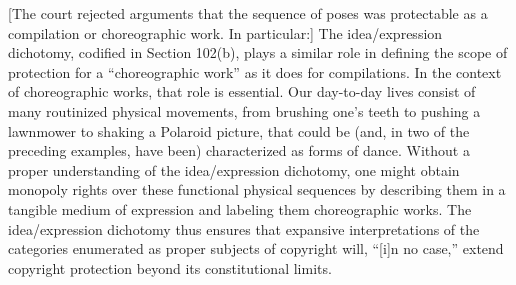 %

[The court rejected arguments that the sequence of poses was protectable as a
compilation or choreographic work. In particular:]
The idea/expression dichotomy, codified in Section 102(b), plays a
similar role in defining the scope of protection for a ``choreographic
work'' as it does for compilations.
In the context of choreographic works, that role is essential. Our
day-to-day lives consist of many routinized physical movements, from
brushing one's teeth to pushing a lawnmower to shaking a Polaroid
picture, that could be (and, in two of the preceding examples, have
been)
characterized as forms of dance. Without a proper understanding of the
idea/expression dichotomy, one might obtain monopoly rights over these
functional physical sequences by describing them in a tangible medium of
expression and labeling them choreographic works. The idea/expression
dichotomy thus ensures that expansive interpretations of the categories
enumerated as proper subjects of copyright will, ``[i]n no case,'' extend
copyright protection beyond its constitutional limits.


%
%
%
%
%
%
